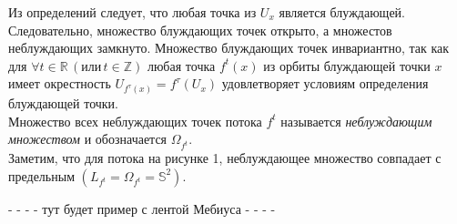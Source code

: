 
\noindent Из определений следует, что любая точка из \(U_{x} \) является блуждающей. Следовательно, множество 
блуждающих точек открыто, а множестов неблуждающих замкнуто. Множество блуждающих
точек инвариантно, так как для \(\forall t \in \mathbb{R}\, (\text{или}\, t \in \mathbb{Z})\) любая точка \(f^t(x)\) из орбиты блуждающей точки
\(x\) имеет окрестность \(U_{f^{\tau}(x)} = f^{\tau}(U_{x})\) удовлетворяет условиям определения блуждающей точки. 
\\[1mm]
Множество всех неблуждающих точек потока \(f^t\) называется \textit{неблуждающим множеством} и обозначается \(\Omega_{f^t}\). 
\\[2mm]
Заметим, что для потока на рисунке 1, неблуждающее множество совпадает с предельным \((L_{f^{t}} = \Omega_{f^t} = \mathbb{S}^2 )\). 

- - - - тут будет пример с лентой Мебиуса - - - -